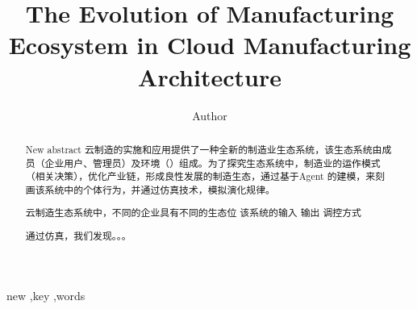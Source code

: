 
\title{The Evolution of Manufacturing Ecosystem in Cloud Manufacturing Architecture
}

\author[label1]{Author}
\address[label1]{ZJU}
\begin{abstract}
New abstract
云制造的实施和应用提供了一种全新的制造业生态系统，该生态系统由成员（企业用户、管理员）及环境（）组成。为了探究生态系统中，制造业的运作模式（相关决策），优化产业链，形成良性发展的制造生态，通过基于Agent 的建模，来刻画该系统中的个体行为，并通过仿真技术，模拟演化规律。

云制造生态系统中，不同的企业具有不同的生态位
该系统的输入
输出
调控方式

通过仿真，我们发现。。。


\end{abstract}

\begin{keyword}
new \sep key \sep words
\end{keyword}